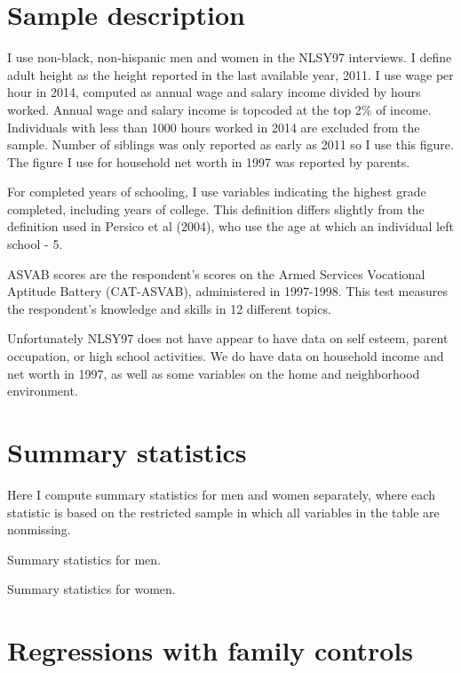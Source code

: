 \documentclass{article}
\begin{document}
\section{Sample description}
I use non-black, non-hispanic men and women in the NLSY97 interviews. I define adult height as the height reported in the last available year, 2011. I use wage per hour in 2014, computed as annual wage and salary income divided by hours worked. Annual wage and salary income is topcoded at the top 2\% of income. Individuals with less than 1000 hours worked in 2014 are excluded from the sample. Number of siblings was only reported as early as 2011 so I use this figure. The figure I use for household net worth in 1997 was reported by parents.

For completed years of schooling, I use variables indicating the highest grade completed, including years of college. This definition differs slightly from the definition used in Persico et al (2004), who use the age at which an individual left school - 5.

ASVAB scores are the respondent's scores on the Armed Services Vocational Aptitude Battery (CAT-ASVAB), administered in 1997-1998. This test measures the respondent's knowledge and skills in 12 different topics.

Unfortunately NLSY97 does not have appear to have data on self esteem, parent occupation, or high school activities. We do have data on household income and net worth in 1997, as well as some variables on the home and neighborhood environment.

\section{Summary statistics}
Here I compute summary statistics for men and women separately, where each statistic is based on the restricted sample in which all variables in the table are nonmissing.

\begin{table}[h]
\label{tab:summary_men}
\caption{Summary statistics for men.}

\end{table}

\begin{table}[h]
\label{tab:summary_women}
\caption{Summary statistics for women.}

\end{table}

\clearpage

\section{Regressions with family controls}
\end{document}
